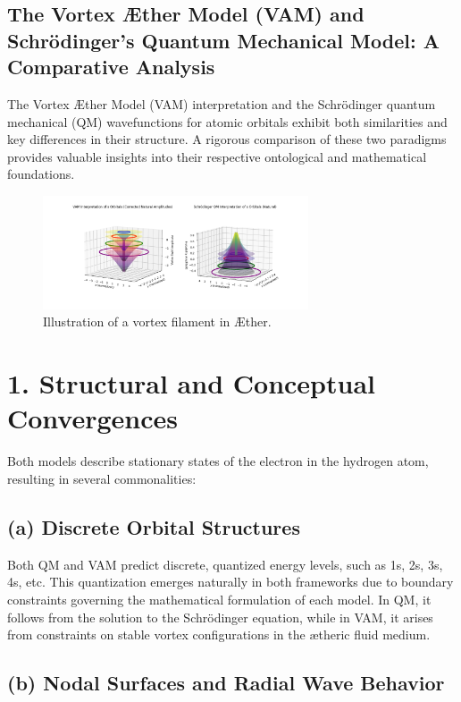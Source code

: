 

\subsection{The Vortex Æther Model (VAM) and Schrödinger's Quantum Mechanical Model: A Comparative Analysis}

The Vortex Æther Model (VAM) interpretation and the Schrödinger quantum mechanical (QM) wavefunctions for atomic orbitals exhibit both similarities and key differences in their structure. A rigorous comparison of these two paradigms provides valuable insights into their respective ontological and mathematical foundations.

\begin{figure}[h]
    \centering
    \includegraphics[width=0.7\textwidth]{vortex_diagram}
    \caption{Illustration of a vortex filament in Æther.}
    \label{fig:vortex}
\end{figure}

\section*{1. Structural and Conceptual Convergences}

Both models describe stationary states of the electron in the hydrogen atom, resulting in several commonalities:

\subsection*{(a) Discrete Orbital Structures}

Both QM and VAM predict discrete, quantized energy levels, such as 1s, 2s, 3s, 4s, etc. This quantization emerges naturally in both frameworks due to boundary constraints governing the mathematical formulation of each model. In QM, it follows from the solution to the Schrödinger equation, while in VAM, it arises from constraints on stable vortex configurations in the ætheric fluid medium.

\subsection*{(b) Nodal Surfaces and Radial Wave Behavior}

